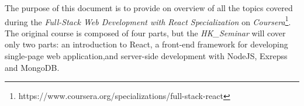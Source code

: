 \documentclass[twoside]{supsistudent}
\begin{document}
\maketitle
\onehalfspacing
\frontmatter



\newpage
\mainmatter
{}
\setcounter{page}{1}

The purpose of this document is to provide on overview of all the topics covered during the \textit{Full-Stack Web Development with React Specialization} on \textit{Coursera}\footnote{https://www.coursera.org/specializations/full-stack-react}. The original course is composed of four parts, but the \textit{HK\_Seminar} will cover only two parts: an introduction to React, a front-end framework for developing single-page web application,and server-side development with NodeJS, Exrepss and MongoDB.



% 
% 
\end{document}
